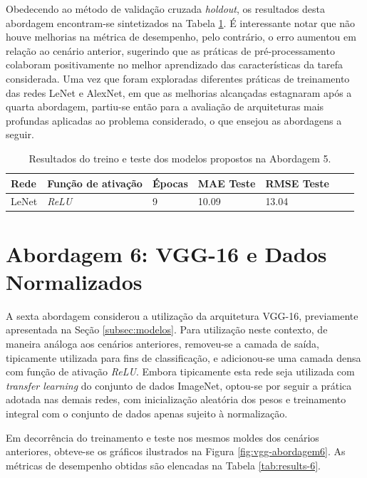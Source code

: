 	Obedecendo ao método de validação cruzada \emph{holdout}, os resultados desta abordagem encontram-se sintetizados na Tabela \ref{tab:results-5}. É interessante notar que não houve melhorias na métrica de desempenho, pelo contrário, o erro aumentou em relação ao cenário anterior, sugerindo que as práticas de pré-processamento colaboram positivamente no melhor aprendizado das características da tarefa considerada. Uma vez que foram exploradas diferentes práticas de treinamento das redes LeNet e AlexNet, em que as melhorias alcançadas estagnaram após a quarta abordagem, partiu-se então para a avaliação de arquiteturas mais profundas aplicadas ao problema considerado, o que ensejou as abordagens a seguir.

	\begin{table}[!ht]
		\centering
		\caption{Resultados do treino e teste dos modelos propostos na Abordagem 5.}
		\label{tab:results-5}
			\begin{tabular}{l l l l l l l}
				\toprule
				Rede & Função de ativação & Épocas & MAE Teste & RMSE Teste \\
				\midrule
				LeNet & \emph{ReLU} & 9 &  10.09 & 13.04 \\
				\bottomrule
			\end{tabular}
		\end{table}


\section{Abordagem 6: VGG-16 e Dados Normalizados}
	A sexta abordagem considerou a utilização da arquitetura VGG-16, previamente apresentada na Seção \ref{subsec:modelos}. Para utilização neste contexto, de maneira análoga aos cenários anteriores, removeu-se a camada de saída, tipicamente utilizada para fins de classificação, e adicionou-se uma camada densa com função de ativação \emph{ReLU}. Embora tipicamente esta rede seja utilizada com \emph{transfer learning} do conjunto de dados ImageNet, optou-se por seguir a prática adotada nas demais redes, com inicialização aleatória dos pesos e treinamento integral com o conjunto de dados apenas sujeito à normalização.

	Em decorrência do treinamento e teste nos mesmos moldes dos cenários anteriores, obteve-se os gráficos ilustrados na Figura \ref{fig:vgg-abordagem6}. As métricas de desempenho obtidas são elencadas na Tabela \ref{tab:results-6}.

